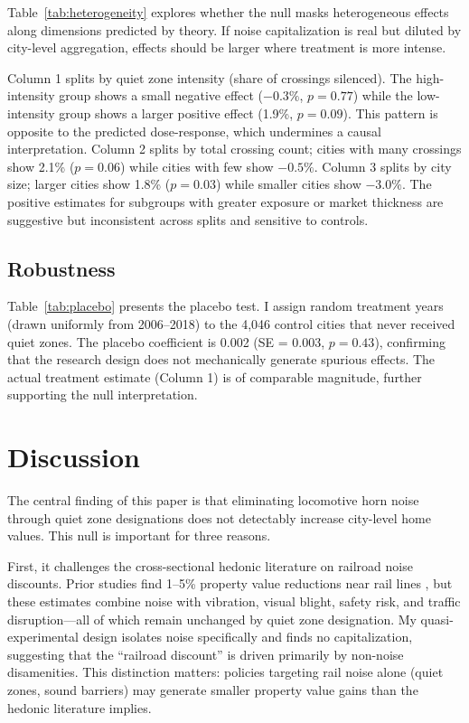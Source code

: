 \documentclass[12pt]{article}
\begin{document}
Table~\ref{tab:heterogeneity} explores whether the null masks heterogeneous effects along dimensions predicted by theory. If noise capitalization is real but diluted by city-level aggregation, effects should be larger where treatment is more intense.

Column 1 splits by quiet zone intensity (share of crossings silenced). The high-intensity group shows a small negative effect ($-0.3\%$, $p = 0.77$) while the low-intensity group shows a larger positive effect (1.9\%, $p = 0.09$). This pattern is opposite to the predicted dose-response, which undermines a causal interpretation. Column 2 splits by total crossing count; cities with many crossings show 2.1\% ($p = 0.06$) while cities with few show $-0.5\%$. Column 3 splits by city size; larger cities show 1.8\% ($p = 0.03$) while smaller cities show $-3.0\%$. The positive estimates for subgroups with greater exposure or market thickness are suggestive but inconsistent across splits and sensitive to controls.

\subsection{Robustness}



Table~\ref{tab:placebo} presents the placebo test. I assign random treatment years (drawn uniformly from 2006--2018) to the 4,046 control cities that never received quiet zones. The placebo coefficient is 0.002 (SE = 0.003, $p = 0.43$), confirming that the research design does not mechanically generate spurious effects. The actual treatment estimate (Column 1) is of comparable magnitude, further supporting the null interpretation.


\section{Discussion}

The central finding of this paper is that eliminating locomotive horn noise through quiet zone designations does not detectably increase city-level home values. This null is important for three reasons.

First, it challenges the cross-sectional hedonic literature on railroad noise discounts. Prior studies find 1--5\% property value reductions near rail lines \citep{theebe2004planes, espey2004valuing, walker2016housing, clark2023rail}, but these estimates combine noise with vibration, visual blight, safety risk, and traffic disruption---all of which remain unchanged by quiet zone designation. My quasi-experimental design isolates noise specifically and finds no capitalization, suggesting that the ``railroad discount'' is driven primarily by non-noise disamenities. This distinction matters: policies targeting rail noise alone (quiet zones, sound barriers) may generate smaller property value gains than the hedonic literature implies.
\end{document}
